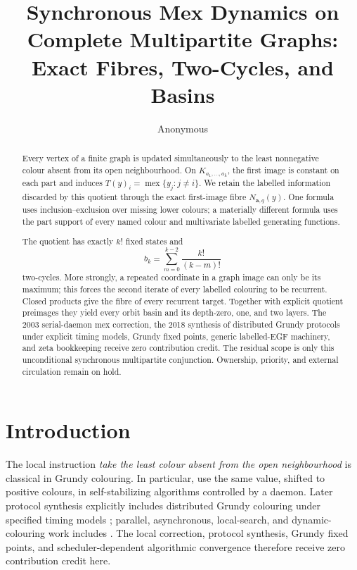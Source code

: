 \documentclass[11pt,a4paper]{amsart}
\title[Synchronous multipartite mex dynamics]{Synchronous Mex Dynamics on
Complete Multipartite Graphs: Exact Fibres, Two-Cycles, and Basins}
\author{Anonymous}
\date{}
\theoremstyle{definition}
\theoremstyle{remark}
\newcommand{\mex}{\operatorname{mex}}
\begin{document}
\begin{abstract}
Every vertex of a finite graph is updated simultaneously to the least
nonnegative colour absent from its open neighbourhood.  On
\(K_{a_1,\ldots,a_k}\), the first image is constant on each part and induces
\(T(y)_i=\mex\{y_j:j\ne i\}\).  We retain the labelled information discarded
by this quotient through the exact first-image fibre
\(N_{\mathbf a,q}(y)\).  One formula uses inclusion--exclusion over missing
lower colours; a materially different formula uses the part support of every
named colour and multivariate labelled generating functions.

The quotient has exactly \(k!\) fixed states and
\[
 b_k=\sum_{m=0}^{k-2}\frac{k!}{(k-m)!}
\]
two-cycles.  More strongly, a repeated coordinate in a graph image can only
be its maximum; this forces the second iterate of every labelled colouring
to be recurrent.  Closed products give the fibre of every recurrent target.
Together with explicit quotient preimages they yield every orbit basin and
its depth-zero, one, and two layers.  The 2003 serial-daemon mex correction,
the 2018 synthesis of distributed Grundy protocols under explicit timing
models, Grundy fixed points, generic labelled-EGF machinery, and zeta
bookkeeping receive zero contribution credit.  The residual scope is only
this unconditional synchronous multipartite conjunction.  Ownership,
priority, and external circulation remain on hold.
\end{abstract}

\maketitle

\section{Introduction}

The local instruction \emph{take the least colour absent from the open
neighbourhood} is classical in Grundy colouring.  In particular,
\citet{HedetniemiJacobsSrimani2003} use the same value, shifted to positive
colours, in self-stabilizing algorithms controlled by a daemon.  Later
protocol synthesis explicitly includes distributed Grundy colouring under
specified timing models \cite{FaghihEtAl2018}; parallel, asynchronous,
local-search, and dynamic-colouring work includes
\cite{FirozZalewskiLumsdaine2019,BossekEtAl2021}.  The local correction,
protocol synthesis, Grundy fixed points, and scheduler-dependent algorithmic
convergence therefore receive zero contribution credit here.
\end{document}
